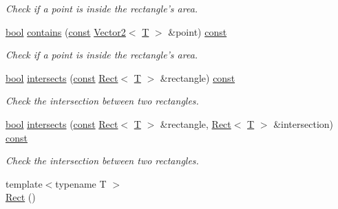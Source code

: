 \begin{DoxyCompactItemize}
\begin{DoxyCompactList}\small\item\em Check if a point is inside the rectangle's area. \end{DoxyCompactList}\item 
\hyperlink{term__entry_8h_a002004ba5d663f149f6c38064926abac}{bool} \hyperlink{classsf_1_1_rect_a24163acdb9b2987c0ea55c201e270d41}{contains} (\hyperlink{term__entry_8h_a57bd63ce7f9a353488880e3de6692d5a}{const} \hyperlink{classsf_1_1_vector2}{Vector2}$<$ \hyperlink{curses_8priv_8h_a5ef253115820acf7d27f3c5c3b02a0f0}{T} $>$ \&point) \hyperlink{term__entry_8h_a57bd63ce7f9a353488880e3de6692d5a}{const} 
\begin{DoxyCompactList}\small\item\em Check if a point is inside the rectangle's area. \end{DoxyCompactList}\item 
\hyperlink{term__entry_8h_a002004ba5d663f149f6c38064926abac}{bool} \hyperlink{classsf_1_1_rect_a566740c8f58e01bb052266f47e7e1011}{intersects} (\hyperlink{term__entry_8h_a57bd63ce7f9a353488880e3de6692d5a}{const} \hyperlink{classsf_1_1_rect}{Rect}$<$ \hyperlink{curses_8priv_8h_a5ef253115820acf7d27f3c5c3b02a0f0}{T} $>$ \&rectangle) \hyperlink{term__entry_8h_a57bd63ce7f9a353488880e3de6692d5a}{const} 
\begin{DoxyCompactList}\small\item\em Check the intersection between two rectangles. \end{DoxyCompactList}\item 
\hyperlink{term__entry_8h_a002004ba5d663f149f6c38064926abac}{bool} \hyperlink{classsf_1_1_rect_a5f1874792b04c7e221bb786b31f5836e}{intersects} (\hyperlink{term__entry_8h_a57bd63ce7f9a353488880e3de6692d5a}{const} \hyperlink{classsf_1_1_rect}{Rect}$<$ \hyperlink{curses_8priv_8h_a5ef253115820acf7d27f3c5c3b02a0f0}{T} $>$ \&rectangle, \hyperlink{classsf_1_1_rect}{Rect}$<$ \hyperlink{curses_8priv_8h_a5ef253115820acf7d27f3c5c3b02a0f0}{T} $>$ \&intersection) \hyperlink{term__entry_8h_a57bd63ce7f9a353488880e3de6692d5a}{const} 
\begin{DoxyCompactList}\small\item\em Check the intersection between two rectangles. \end{DoxyCompactList}\item 
{\footnotesize template$<$typename T $>$ }\\\hyperlink{classsf_1_1_rect_a8fbc399054de8bbcd979e9062712896d}{Rect} ()
\item 

\end{DoxyCompactItemize}
